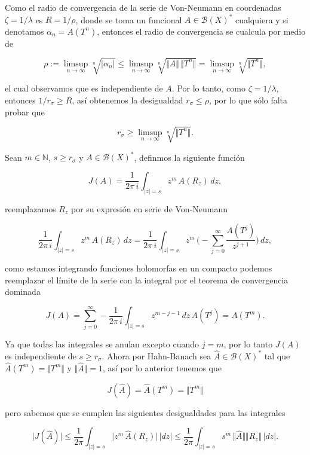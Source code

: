 \documentclass[letterpaper]{report}
\newcommand{\nat}{\ensuremath{ \mathbb N }}
\begin{document}
\noindent \begin{dem}
Como el radio de convergencia de la serie de Von-Neumann en coordenadas $\zeta=1/\lambda$ es $R=1/\rho$, donde se toma un funcional $A\in\mathcal{B}(X)^*$ cualquiera y si denotamos $\alpha_n=A(T^n)$, entonces el radio de convergencia se cualcula por medio de

\begin{equation}
\rho:=\limsup_{n\rightarrow\infty} \sqrt[n]{\vert\alpha_n\vert}\leq
\limsup_{n\rightarrow\infty} \sqrt[n]{\Vert A\Vert\,\Vert T^n\Vert}=
\limsup_{n\rightarrow\infty} \sqrt[n]{\Vert T^n\Vert},
\end{equation}

el cual observamos que es independiente de $A$. Por lo tanto, como $\zeta=1/\lambda$, entonces $1/r_{\sigma}\geq R$, así obtenemos la desigualdad $r_{\sigma}\leq\rho$, por lo que sólo falta probar que

$$r_{\sigma}\geq\limsup_{n\rightarrow\infty}\sqrt[n]{\Vert T^n\Vert}.$$

Sean $m\in\nat$, $s\geq r_{\sigma}$ y $A\in\mathcal{B}(X)^*$, definmos la siguiente función

\begin{equation}
J(A)=\frac{1}{2\pi\,i}\int_{\vert z\vert=s} z^m\,A(R_z)\,dz,
\end{equation}

reemplazamos $R_z$ por su expresión en serie de Von-Neumann

$$
\frac{1}{2\pi\,i}\int_{\vert z\vert=s} z^m\,A(R_z)\,dz=
\frac{1}{2\pi\,i}\int_{\vert z\vert=s} z^m\,\Big(-\sum_{j=0}^{\infty}\frac{A(T^j)}{z^{j+1}}\Big)\,dz,
$$

como estamos integrando funciones holomorfas en un compacto podemos reemplazar el límite de la serie con la integral por el teorema de convergencia dominada

$$
J(A)=\sum_{j=0}^{\infty}-\frac{1}{2\pi\,i}\int_{\vert z\vert=s} z^{m-j-1}\,dz\, A(T^j)=A(T^m).
$$

Ya que todas las integrales se anulan excepto cuando $j=m$, por lo tanto $J(A)$ es independiente de $s\geq r_{\sigma}$. Ahora por Hahn-Banach sea $\widehat{A}\in\mathcal{B}(X)^*$ tal que $\widehat{A}(T^m)=\Vert T^m\Vert$ y $\Vert\widehat{A}\Vert=1$, así por lo anterior tenemos que 

$$J(\widehat{A})=\widehat{A}(T^m)=\Vert T^m\Vert$$ 

pero sabemos que se cumplen las siguientes desigualdades para las integrales

$$
\vert J(\widehat{A})\vert\leq
\frac{1}{2\pi}\int_{\vert z\vert=s}\vert z^m\,\widehat{A}(R_z)\vert\,\vert dz\vert\leq
\frac{1}{2\pi}\int_{\vert z\vert=s} s^m\,\Vert\widehat{A}\Vert\Vert R_z \Vert\,\vert dz\vert.
$$


\end{dem}
\end{document}
